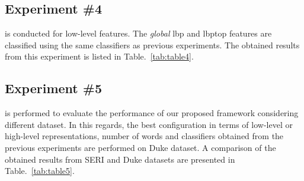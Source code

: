 \subsection{Experiment \#4}
 is conducted for low-level features.
The \emph{global} \ac{lbp} and \ac{lbptop} features are classified using the same classifiers as previous experiments.
The obtained results from this experiment is listed in Table.~\ref{tab:table4}.\\


\subsection{Experiment \#5}
 is performed to evaluate the performance of our proposed framework considering different dataset.
In this regards, the best configuration in terms of low-level or high-level representations, number of words and classifiers obtained from the previous experiments are performed on Duke dataset.
A comparison of the obtained results from SERI and Duke datasets are presented in Table.~\ref{tab:table5}.
  



